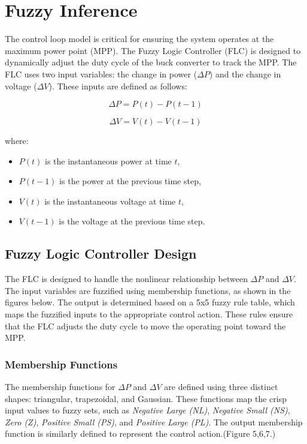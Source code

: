 \documentclass[conference]{IEEEtran}
\begin{document}
\section{Fuzzy Inference}
The control loop model is critical for ensuring the system operates at the maximum power point (MPP). The Fuzzy Logic Controller (FLC) is designed to dynamically adjust the duty cycle of the buck converter to track the MPP. The FLC uses two input variables: the change in power (\(\Delta P\)) and the change in voltage (\(\Delta V\)). These inputs are defined as follows:

\begin{equation}
\Delta P = P(t) - P(t-1)
\end{equation}

\begin{equation}
\Delta V = V(t) - V(t-1)
\end{equation}

where:
\begin{itemize}
    \item \(P(t)\) is the instantaneous power at time \(t\),
    \item \(P(t-1)\) is the power at the previous time step,
    \item \(V(t)\) is the instantaneous voltage at time \(t\),
    \item \(V(t-1)\) is the voltage at the previous time step.
\end{itemize}
\vspace{\baselineskip}

\subsection{Fuzzy Logic Controller Design}
The FLC is designed to handle the nonlinear relationship between \(\Delta P\) and \(\Delta V\). The input variables are fuzzified using membership functions, as shown in the figures below. The output is determined based on a 5x5 fuzzy rule table, which maps the fuzzified inputs to the appropriate control action. These rules ensure that the FLC adjusts the duty cycle to move the operating point toward the MPP.

\subsubsection{Membership Functions}
The membership functions for \(\Delta P\) and \(\Delta V\) are defined using three distinct shapes: triangular, trapezoidal, and Gaussian. These functions map the crisp input values to fuzzy sets, such as \textit{Negative Large (NL)}, \textit{Negative Small (NS)}, \textit{Zero (Z)}, \textit{Positive Small (PS)}, and \textit{Positive Large (PL)}. The output membership function is similarly defined to represent the control action.(Figure 5,6,7.) 
\end{document}
